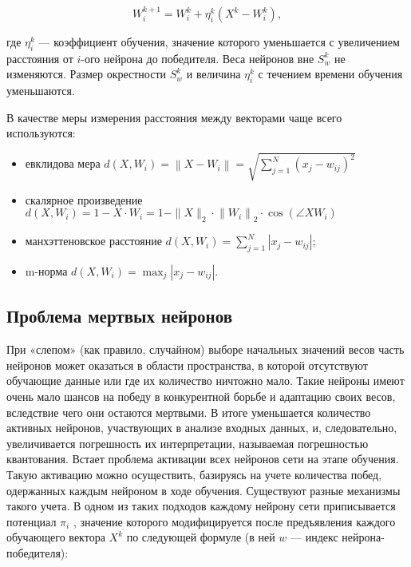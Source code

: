 \begin{equation}
	W_{i}^{k+1} = W_{i}^{k}+\eta_{i}^{k}\left(X^{k}-W_{i}^{k}\right) ,
\end{equation}

где $\eta^k_i$ --- коэффициент обучения, значение которого уменьшается с увеличением расстояния от $i$-ого нейрона до победителя. Веса нейронов вне $S^k_w$ не изменяются. Размер окрестности $S^k_w$ и величина $\eta^k_i$ с течением времени обучения уменьшаются.

В качестве меры измерения расстояния между векторами чаще всего
используются:

\begin{itemize}
\item евклидова мера $d \left( X , W _ { i } \right) = \left\| X - W _ { i } \right\| = \sqrt { \sum _ { j = 1 } ^ { N } \left( x _ { j } - w _ { i j } \right) ^ { 2 } }$
\item скалярное произведение
$d \left( X , W _ { i } \right) = 1 - X \cdot W _ { i } = 1 - \| X \| _ { 2 } \cdot \left\| W _ { i } \right\| _ { 2 } \cdot \cos \left( \angle X W _ { i } \right)$

\item манхэттеновское расстояние $d \left( X , W _ { i } \right) = \sum _ { j = 1 } ^ { N } \left| x _ { j } - w _ { i j } \right|$;

\item m-норма $d \left( X , W _ { i } \right) = \max _ { j } \left| x _ { j } - w _ { i j } \right|$.
\end{itemize}

\subsection{Проблема мертвых нейронов}
\label{seq:deadNeurons}
При «слепом» (как правило, случайном) выборе начальных значений весов
часть нейронов может оказаться в области пространства, в которой
отсутствуют обучающие данные или где их количество ничтожно мало.
Такие нейроны имеют очень мало шансов на победу в конкурентной
борьбе и адаптацию своих весов, вследствие чего они остаются мертвыми.
В итоге уменьшается количество активных нейронов, участвующих
в анализе входных данных, и, следовательно, увеличивается погрешность
их интерпретации, называемая погрешностью квантования. Встает проблема
активации всех нейронов сети на этапе обучения.
Такую активацию можно осуществить, базируясь на учете количества
побед, одержанных каждым нейроном в ходе обучения. Существуют
разные механизмы такого учета.
В одном из таких подходов каждому нейрону сети приписывается
потенциал $\pi_i$
, значение которого модифицируется после предъявления
каждого обучающего вектора $X^k$ по следующей формуле (в ней $w$ —
индекс нейрона-победителя):

